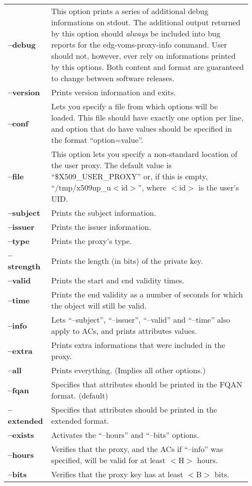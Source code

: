 \documentclass[a4paper]{book}
\begin{document}
\begin{longtable}{lp{3in}}
\textbf{--debug}    & This option prints a series of additional debug
		      informations on stdout.  The additional output
		      returned by this option should \emph{always} be
		      included into bug reports for the
		      edg-voms-proxy-info command.  User should not,
		      however, ever rely on informations printed by
		      this options.  Both content and format are
		      guaranteed to change between software
		      releases.\\
\textbf{--version}  & Prints version information and exits.\\
\textbf{--conf}     & Lets you specify a file from which options will
		      be loaded.  This file should have exactly one
		      option per line, and option that do have values
		      should be specified in the format
		      ``option=value''.\\ 
\textbf{--file}     & This option lets you specify a non-standard
		      location of the user proxy.  The default value
		      is ``\$X509\_USER\_PROXY'' or, if this is empty,
		      ``/tmp/x509up\_u$<$id$>$'', where $<$id$>$ is
		      the user's UID.\\
\textbf{--subject}  & Prints the subject information.\\
\textbf{--issuer}   & Prints the issuer information.\\
\textbf{--type}     & Prints the proxy's type.\\
\textbf{--strength} & Prints the length (in bits) of the private
		      key.\\
\textbf{--valid}    & Prints the start and end validity times.\\
\textbf{--time}     & Prints the end validity as a number of seconds
		      for which the object will still be valid.\\
\textbf{--info}     & Lets ``--subject'', ``--issuer'', ``--valid''
		      and ``--time'' also apply to ACs, and prints
		      attributes values.\\
\textbf{--extra}    & Prints extra informations that were included in
		      the proxy.\\
\textbf{--all}      & Prints everything. (Implies all other
		      options.)\\
\textbf{--fqan}     & Specifies that attributes should be printed in
		      the FQAN format. (default)\\
\textbf{--extended} & Specifies that attributes should be printed in
		      the extended format.\\
\textbf{--exists}   & Activates the ``--hours'' and ``--bits''
		      options.\\
\textbf{--hours}    & Verifies that the proxy, and the ACs if
		      ``--info'' was specified, will be valid for at
		      least $<$H$>$ hours.\\
\textbf{--bits}     & Verifies that the proxy key has at least $<$B$>$
		      bits.\\
\end{longtable}
\end{document}
